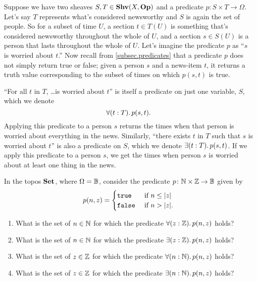 \documentclass[7Sketches]{subfiles}
\begin{document}
\begin{example}%
\label{ex.worried_pred}
Suppose we have two sheaves $S,T\in\mathbf{Shv}(X,\mathbf{Op})$ and a predicate $p\colon S\times T\to\Omega$. Let's say $T$ represents what's considered newsworthy and $S$ is again the set of people. So for a subset of time $U$, a section $t\in T(U)$ is something that's considered newsworthy throughout the whole of $U$, and a section $s\in S(U)$ is a person that lasts throughout the whole of $U$. Let's imagine the predicate $p$ as ``$s$ is worried about $t$.'' Now recall from \cref{subsec.predicates} that a predicate $p$ does not simply return true or false; given a person $s$ and a news-item $t$, it returns a truth value corresponding to the subset of times on which $p(s,t)$ is true. 

``For all $t$ in $T$, \dots is worried about $t$'' is itself a predicate on just one variable, $S$, which we denote
\[\forall(t:T)\ldotp p(s,t).\]
Applying this predicate to a person $s$ returns the times when that person is worried about everything in the news. Similarly, ``there exists $t$ in $T$ such that $s$ is worried about $t$'' is also a predicate on $S$, which we denote $\exists(t:T)\ldotp p(s,t)$. If we apply this predicate to a person $s$, we get the times when person $s$ is worried about at least one thing in the news.
\end{example}

\begin{exercise}%
\label{exc.predicate_practice}
In the topos $\mathbf{Set}$, where $\Omega=\mathbb{B}$, consider the predicate $p\colon\mathbb{N}\times\mathbb{Z}\to\mathbb{B}$ given by
\[
  p(n,z)=
  \begin{cases}
    \mathtt{true}&\textnormal{ if }n\leq|z|\\
    \mathtt{false}&\textnormal{ if }n>|z|.
  \end{cases}
\]
\begin{enumerate}
	\item What is the set of $n\in\mathbb{N}$ for which the predicate $\forall(z:\mathbb{Z})\ldotp p(n,z)$ holds?
	\item What is the set of $n\in\mathbb{N}$ for which the predicate $\exists(z:\mathbb{Z})\ldotp p(n,z)$ holds?
	\item What is the set of $z\in\mathbb{Z}$ for which the predicate $\forall(n:\mathbb{N})\ldotp p(n,z)$ holds?
	\item What is the set of $z\in\mathbb{Z}$ for which the predicate $\exists(n:\mathbb{N})\ldotp p(n,z)$ holds?	
\qedhere
\end{enumerate}
\end{exercise}
\end{document}
